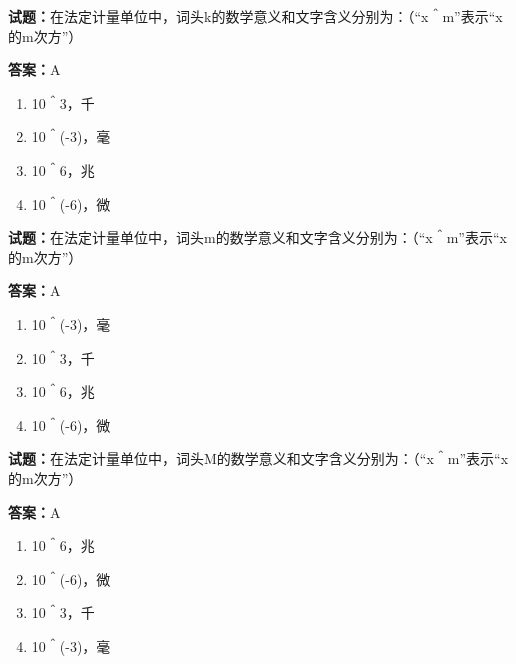 \documentclass{ctexbook}
\begin{document}




\vspace{1em}

\textbf{试题：}在法定计量单位中，词头k的数学意义和文字含义分别为：（“x＾m”表示“x的m次方”） 

\textbf{答案：}A 

\begin{enumerate}[leftmargin=3em]
  \item 10＾3，千 

  \item 10＾(-3)，毫 

  \item 10＾6，兆 

  \item 10＾(-6)，微 

\end{enumerate}





\vspace{1em}

\textbf{试题：}在法定计量单位中，词头m的数学意义和文字含义分别为：（“x＾m”表示“x的m次方”） 

\textbf{答案：}A 

\begin{enumerate}[leftmargin=3em]
  \item 10＾(-3)，毫 

  \item 10＾3，千 

  \item 10＾6，兆 

  \item 10＾(-6)，微 


\end{enumerate}





\vspace{1em}

\textbf{试题：}在法定计量单位中，词头M的数学意义和文字含义分别为：（“x＾m”表示“x的m次方”） 

\textbf{答案：}A 

\begin{enumerate}[leftmargin=3em]
  \item 10＾6，兆 

  \item 10＾(-6)，微 

  \item 10＾3，千 

  \item 10＾(-3)，毫 

\end{enumerate}
\end{document}
